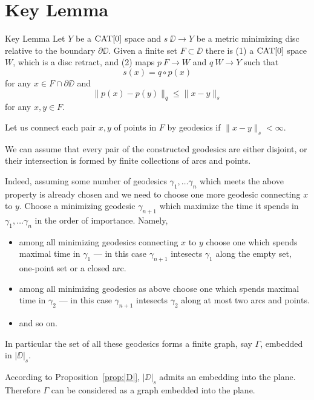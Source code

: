 \documentclass[a4paper,10pt]{amsart}
\begin{document}
\section{Key Lemma}


\begin{thm}{Key Lemma}\label{lem:key}
Let $Y$ be a $\mathop{\rm CAT}\nolimits[0]$ space and $s\:\DD\to Y$ 
be a metric minimizing disc relative to the boundary $\partial \DD$.
Given a finite set $F\subset \DD$
there is 
(1) a $\mathop{\rm CAT}\nolimits[0]$ space $W$, which is a disc retract,
and (2) maps $p\:F\to W$ and $q\:W\to Y$ such that
\[s(x)=q\circ p(x)\] 
for any $x\in F\cap \partial \DD$
and 
\[\|p(x)-p(y)\|_q\le \|x-y\|_s\] 
for any $x,y\in F$.
\end{thm}

Let us connect each pair $x,y$ of points in $F$ by geodesics
if $\|x-y\|_s<\infty$.

We can assume that 
every pair of the constructed geodesics 
are either disjoint, or their intersection is formed by finite collections of arcs and points.

Indeed, assuming some number of geodesics $\gamma_1,\dots\gamma_n$ which meets the above property is already chosen and we need to choose one more geodesic connecting $x$ to $y$.
Choose a minimizing geodesic $\gamma_{n+1}$ which maximize the time it spends in $\gamma_1,\dots\gamma_n$  in the order of importance.
Namely, 
\begin{itemize}
\item  among all minimizing geodesics connecting $x$ to $y$
choose one which spends maximal time in $\gamma_1$ --- in this case $\gamma_{n+1}$ intesects $\gamma_1$ along the empty set, one-point set or a closed arc.
\item among all minimizing geodesics as above
choose one which spends maximal time in $\gamma_2$ --- in this case $\gamma_{n+1}$ intesects $\gamma_2$ along at most two arcs and points.
\item and so on.
\end{itemize}


In particular the set of all these geodesics forms a finite graph, say $\Gamma$,
embedded in $|\DD|_s$. 

According to Proposition~\ref{prop:|D|},
$|\DD|_s$ admits an embedding into the plane.
Therefore $\Gamma$ can be considered as a graph embedded into the plane.
\end{document}
